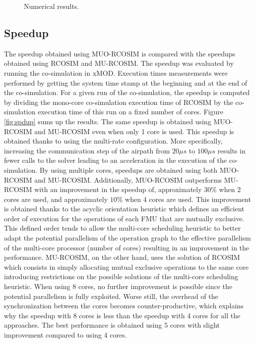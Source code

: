 \begin{figure}[phbt]
\centering

\caption{Numerical results.}
\label{fig:df}
\end{figure}

\subsection{Speedup}

The speedup obtained using MUO-RCOSIM is compared with the speedups obtained using RCOSIM and MU-RCOSIM. The speedup was evaluated by running the co-simulation in xMOD. Execution times measurements were performed by getting the system time stamp at the beginning and at the end of the co-simulation. For a given run of the co-simulation, the speedup is computed by dividing the mono-core co-simulation execution time of RCOSIM by the co-simulation execution time of this run on a fixed number of cores. Figure \ref{fig:spdup} sums up the results. The same speedup is obtained using MUO-RCOSIM and MU-RCOSIM even when only 1 core is used. This speedup is obtained thanks to using the multi-rate configuration. More specifically, increasing the communication step of the airpath from $20 {\mu}s$ to $100 {\mu}s$ results in fewer calls to the solver leading to an acceleration in the execution of the co-simulation. By using multiple cores, speedups are obtained using both MUO-RCOSIM and MU-RCOSIM. Additionally, MUO-RCOSIM outperforms MU-RCOSIM with an improvement in the speedup of, approximately $30\%$ when 2 cores are used, and approximately $10\%$ when 4 cores are used. This improvement is obtained thanks to the acyclic orientation heuristic which defines an efficient order of execution for the operations of each FMU that are mutually exclusive. This defined order tends to allow the multi-core scheduling heuristic to better adapt the potential parallelism of the operation graph to the effective parallelism of the multi-core processor (number of cores) resulting in an improvement in the performance. MU-RCOSIM, on the other hand, uses the solution of RCOSIM which consists in simply allocating mutual exclusive operations to the same core introducing restrictions on the possible solutions of the multi-core scheduling heuristic. When using 8 cores, no further improvement is possible since the potential parallelism is fully exploited. Worse still, the overhead of the synchronization between the cores becomes counter-productive, which explains why the speedup with 8 cores is less than the speedup with 4 cores for all the approaches. The best performance is obtained using 5 cores with slight improvement compared to using 4 cores. 


